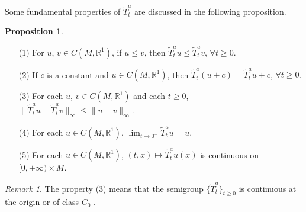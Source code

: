 \documentclass{amsart}[12pt]
\theoremstyle{definition}
\newtheorem{proposition}[theorem]{Proposition}
\theoremstyle{remark}
\newtheorem{remark}[theorem]{Remark}
\numberwithin{equation}{section}
\begin{document}
Some fundamental properties of $\tilde{T}^a_t$ are discussed in
the following proposition.
\begin{proposition}\label{pr4-2}
\noindent\begin{itemize}
    \item [(1)] For $u$, $v\in C(M,\mathbb{R}^1)$, if $u\leq
              v$, then $\tilde{T}^a_tu\leq\tilde{T}^a_tv$, $\forall t\geq
              0$.
    \item [(2)] If $c$ is a constant and $u\in C(M,\mathbb{R}^1)$,
              then $\tilde{T}^a_t(u+c)=\tilde{T}^a_tu+c$, $\forall t\geq
              0$.
    \item [(3)] For each $u$, $v\in C(M,\mathbb{R}^1)$ and each $t\geq 0$,
              $\|\tilde{T}^a_tu-\tilde{T}^a_tv\|_\infty\leq\|u-v\|_\infty$.
    \item [(4)] For each $u\in C(M,\mathbb{R}^1)$, $\lim_{t\rightarrow
              0^+}\tilde{T}^a_tu=u$.
    \item [(5)] For each $u\in C(M,\mathbb{R}^1)$,
               $(t,x)\mapsto\tilde{T}^a_tu(x)$ is continuous on $[0,+\infty)\times
               M$.
\end{itemize}
\end{proposition}

\begin{remark}
The property (3) means
that the semigroup $\{\tilde{T}^a_t\}_{t\geq 0}$ is continuous at
the origin or of class $C_0$ \cite{Kel}.
\end{remark}
\end{document}
